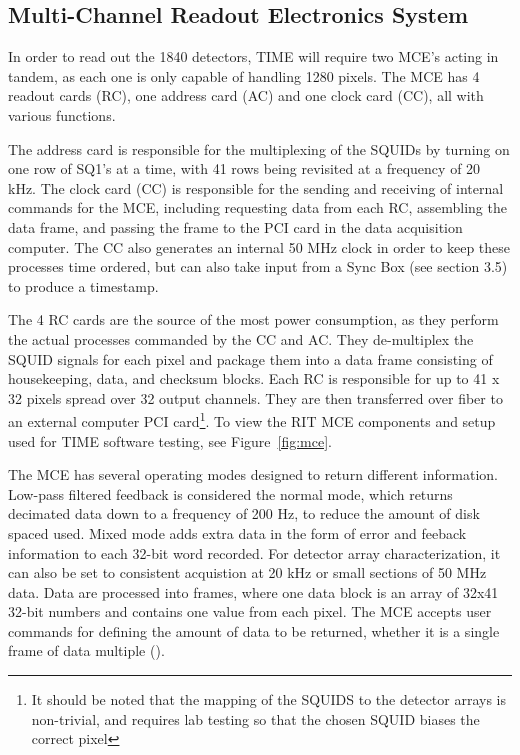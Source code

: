 \documentclass[manuscript]{aastex}
\begin{document}
\subsection{Multi-Channel Readout Electronics System}

In order to read out the 1840 detectors, TIME will require two MCE's acting in tandem, as each one is only capable of handling 1280 pixels. The MCE has 4 readout cards (RC), one address card (AC) and one clock card (CC), all with various functions.

The address card is responsible for the multiplexing of the SQUIDs by turning on one row of SQ1's at a time, with 41 rows being revisited at a frequency of 20 kHz. The clock card (CC) is responsible for the sending and receiving of internal commands for the MCE, including requesting data from each RC, assembling the data frame, and passing the frame to the PCI card in the data acquisition computer. The CC also generates an internal 50 MHz clock in order to keep these processes time ordered, but can also take input from a Sync Box (see section 3.5) to produce a timestamp.

The 4 RC cards are the source of the most power consumption, as they perform the actual processes commanded by the CC and AC. They de-multiplex the SQUID signals for each pixel and package them into a data frame consisting of housekeeping, data, and checksum blocks. Each RC is responsible for up to 41 x 32 pixels spread over 32 output channels. They are then transferred over fiber to an external computer PCI card\footnote{It should be noted that the mapping of the SQUIDS to the detector arrays is non-trivial, and requires lab testing so that the chosen SQUID biases the correct pixel}. To view the RIT MCE components and setup used for TIME software testing, see Figure~\ref{fig:mce}.

The MCE has several operating modes designed to return different information. Low-pass filtered feedback is considered the normal mode, which returns decimated data down to a frequency of 200 Hz, to reduce the amount of disk spaced used. Mixed mode adds extra data in the form of error and feeback information to each 32-bit word recorded. For detector array characterization, it can also be set to consistent acquistion at 20 kHz or small sections of 50 MHz data. Data are processed into frames, where one data block is an array of 32x41 32-bit numbers and contains one value from each pixel. The MCE accepts user commands for defining the amount of data to be returned, whether it is a single frame of data multiple (\cite{Battistelli2008}). 
\end{document}
